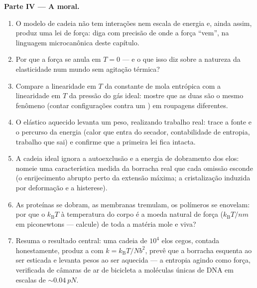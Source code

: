 \begin{problem}
\medskip\noindent\textbf{Parte IV --- A moral.}
\begin{enumerate}[resume]
  \item O modelo de cadeia não tem interações nem escala de energia e,
        ainda assim, produz uma lei de força: diga com precisão de onde
        a força ``vem'', na linguagem microcanônica deste capítulo.
  \item Por que a força se anula em $T = 0$ --- e o que isso diz sobre
        a natureza da elasticidade num mundo sem agitação térmica?
  \item Compare a linearidade em $T$ da constante de mola entrópica com
        a linearidade em $T$ da pressão do gás ideal: mostre que as
        duas são o mesmo fenômeno (contar configurações contra um
        ) em roupagens diferentes.
  \item O elástico aquecido levanta um peso, realizando trabalho real:
        trace a fonte e o percurso da energia (calor que entra do
        secador, contabilidade de entropia, trabalho que sai) e
        confirme que a primeira lei fica intacta.
  \item A cadeia ideal ignora a autoexclusão e a energia de dobramento
        dos elos: nomeie uma característica medida da borracha real que
        cada omissão esconde (o enrijecimento abrupto perto da extensão
        máxima; a cristalização induzida por deformação e a histerese).
  \item As proteínas se dobram, as membranas tremulam, os polímeros se
        enovelam: por que o $k_{\text{B}}T$ à temperatura do corpo é a
        moeda natural de força ($k_{\text{B}}T/\unit{nm}$ em
        piconewtons --- calcule) de toda a matéria mole e viva?
  \item Resuma o resultado central: uma cadeia de $10^4$ elos cegos,
        contada honestamente, produz a  com $k =
        k_{\text{B}}T/Nb^2$, prevê que a borracha esquenta ao ser
        esticada e levanta pesos ao ser aquecida --- a entropia agindo
        como força, verificada de câmaras de ar de bicicleta a
        moléculas únicas de DNA em escalas de $\sim\qty{0.04}{pN}$.
\end{enumerate}
\end{problem}

